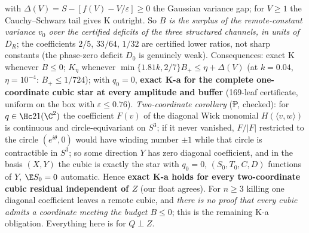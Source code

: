 with $\Delta(V)=S-[f(V)-V/\varepsilon]\ge0$ the Gaussian variance gap; for $V\ge1$ the Cauchy--Schwarz tail gives K outright. So \emph{$B$ is the surplus of the remote-constant variance $v_0$ over
the certified deficits of the three structured channels, in units of $D_R$}; the coefficients $2/5$, $33/64$, $1/32$ are certified lower ratios, not sharp constants (the phase-zero deficit
$D_0$ is genuinely weak). Consequences: exact K whenever $B\le0$; $K_\eta$ whenever $\min\{1.81k,2/7\}B_+\le\eta+\Delta(V)$ (at $k=0.04$, $\eta=10^{-4}$: $B_+\le1/724$); with $q_0=0$,
\textbf{exact K-a for the complete one-coordinate cubic star at every amplitude and buffer} (169-leaf certificate, uniform on the box with $\varepsilon\le0.76$). \emph{Two-coordinate corollary}
(\st{P}, checked): for $q\in\Hc21(\C^2)$ the coefficient $F(v)$ of the diagonal Wick monomial $H(\langle v,w\rangle)$ is continuous and circle-equivariant on $S^3$; if it never vanished,
$F/|F|$ restricted to the circle $(e^{i\theta},0)$ would have winding number $\pm1$ while that circle is contractible in $S^3$; so some direction $Y$ has zero diagonal coefficient, and in the
basis $(X,Y)$ the cubic is exactly the star with $q_0=0$, $(S_0,T_0,C,D)$ functions of $Y$, $\E S_0=0$ automatic. Hence \textbf{exact K-a holds for every two-coordinate cubic residual independent of
$Z$} (our float  agrees). For $n\ge3$ killing one diagonal coefficient leaves a remote cubic, and \emph{there is no proof that every cubic admits a coordinate meeting the
budget $B\le0$}; this is the remaining K-a obligation. Everything here is for $Q\perp Z$.

